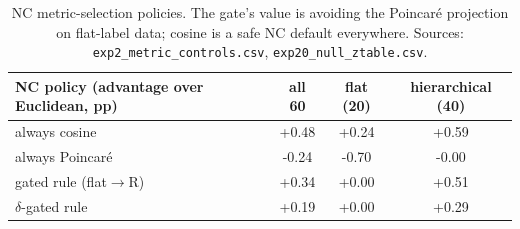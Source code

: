 \begin{table}[H]
\centering
\small
\begin{tabular}{lccc}
\toprule
NC policy (advantage over Euclidean, pp) & all 60 & flat (20) & hierarchical (40) \\
\midrule
always cosine & +0.48 & +0.24 & +0.59 \\
always Poincar\'e & -0.24 & -0.70 & -0.00 \\
gated rule (flat$\to$R) & +0.34 & +0.00 & +0.51 \\
$\delta$-gated rule & +0.19 & +0.00 & +0.29 \\
\bottomrule
\end{tabular}
\caption{NC metric-selection policies. The gate's value is avoiding the Poincar\'e projection on flat-label data; cosine is a safe NC default everywhere. Sources: \texttt{exp2\_metric\_controls.csv}, \texttt{exp20\_null\_ztable.csv}.}
\label{tab:b9-ncpolicies}
\end{table}

